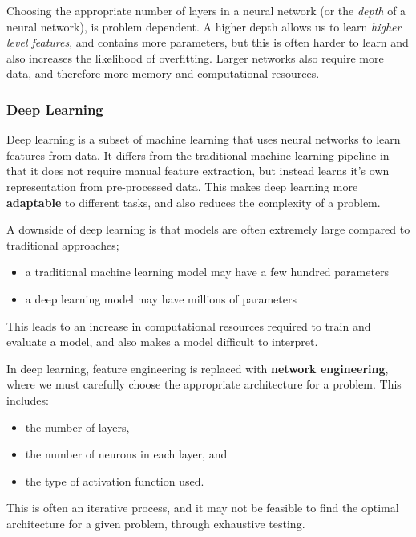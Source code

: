 \documentclass{article}
\begin{document}
Choosing the appropriate number of layers in a neural network (or the
\textit{depth} of a neural network), is problem dependent. A higher
depth allows us to learn \textit{higher level features}, and contains
more parameters, but this is often harder to learn and also increases
the likelihood of overfitting. Larger networks also require more data,
and therefore more memory and computational resources.
\subsubsection{Deep Learning}
Deep learning is a subset of machine learning that uses neural networks
to learn features from data. It differs from the traditional machine
learning pipeline in that it does not require manual feature
extraction, but instead learns it's own representation from
pre-processed data. This makes deep learning more \textbf{adaptable} to
different tasks, and also reduces the complexity of a problem.

A downside of deep learning is that models are often extremely large
compared to traditional approaches;
\begin{itemize}
    \item a traditional machine learning model may have a few hundred
          parameters
    \item a deep learning model may have millions of parameters
\end{itemize}
This leads to an increase in computational resources required to train
and evaluate a model, and also makes a model difficult to interpret.

In deep learning, feature engineering is replaced with \textbf{network
engineering}, where we must carefully choose the appropriate
architecture for a problem. This includes:
\begin{itemize}
    \item the number of layers,
    \item the number of neurons in each layer, and
    \item the type of activation function used.
\end{itemize}
This is often an iterative process, and it may not be feasible to find
the optimal architecture for a given problem, through exhaustive
testing.
\end{document}

